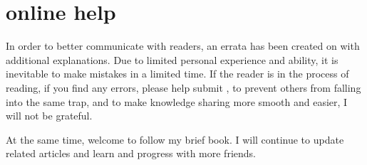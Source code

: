 





\section*{online help}

\begin{content}

In order to better communicate with readers, an errata has been created on  with additional explanations. Due to limited personal experience and ability, it is inevitable to make mistakes in a limited time. If the reader is in the process of reading, if you find any errors, please help submit , to prevent others from falling into the same trap, and to make knowledge sharing more smooth and easier, I will not be grateful.

At the same time, welcome to follow my brief book. I will continue to update related articles and learn and progress with more friends.

\begin{enum}
\end{enum}

\end{content}

